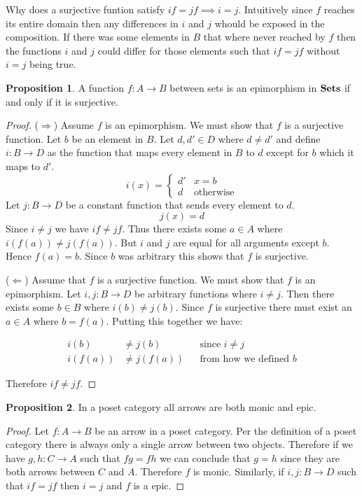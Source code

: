 \documentclass{book}
\theoremstyle{definition}
\newtheorem{proposition}{Proposition}
\newcommand{\arr}[3]{#1 : #2 \rightarrow #3}
\begin{document}
Why does a surjective funtion satisfy $if = jf \implies i = j$. Intuitively
since $f$ reaches its entire domain then any differences in $i$ and $j$ whould
be exposed in the composition. If there was some elements in $B$ that where
never reached by $f$ then the functions $i$ and $j$ could differ for those
elements such that $if = jf$ without $i = j$ being true.

\begin{proposition}
  A function $f : A \to B$ between sets is an epimorphism in $\bf{Sets}$ if and
  only if it is surjective.
\end{proposition}
\begin{proof}
  ($\Rightarrow$) Assume $f$ is an epimorphism. We must show that $f$ is a surjective
  function. Let $b$ be an element in $B$. Let $d, d' \in D$ where $d \neq d'$ and
  define $i : B \to D$ as the function that maps every element in $B$ to $d$
  except for $b$ which it maps to $d'$.
  \[
    i(x) = \begin{cases}
      d' & x = b \\
      d & \text{otherwise}
    \end{cases}
  \]
  Let $j : B \to D$ be a constant function that sends every element to $d$.
  \[
    j(x) = d
  \]
  Since $i \neq j$ we have $if \neq jf$. Thus there exists some $a \in A$ where
  $i(f(a)) \neq j(f(a))$. But $i$ and $j$ are equal for all arguments except
  $b$. Hence $f(a) = b$. Since $b$ was arbitrary this shows that $f$ is
  surjective.

  ($\Leftarrow$) Assume that $f$ is a surjective function. We must show that $f$ is an
  epimorphism. Let $i, j : B \to D$ be arbitrary functions where $i \neq j$. Then
  there exists some $b \in B$ where $i(b) \neq j(b)$. Since $f$ is surjective there
  must exist an $a \in A$ where $b = f(a)$. Putting this together we have:

  \begin{align*}
    i(b) &\neq j(b) && \text{since $i \neq j$} \\
    i(f(a)) &\neq j(f(a)) && \text{from how we defined $b$}
  \end{align*}

  Therefore $if \neq jf$.
\end{proof}

\begin{proposition}
  In a poset category all arrows are both monic and epic.
\end{proposition}
\begin{proof}
  Let $f : A \to B$ be an arrow in a poset category. Per the definition of a
  poset category there is always only a single arrow between two objects.
  Therefore if we have $g, h : C \to A$ such that $fg = fh$ we can conclude
  that $g = h$ since they are both arrows between $C$ and $A$. Therefore $f$ is
  monic. Similarly, if $\arr{i, j}{B}{D}$ such that $if = jf$ then $i = j$ and
  $f$ is a epic.
\end{proof}
\end{document}

